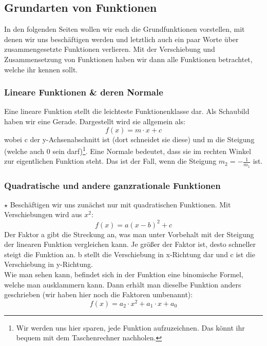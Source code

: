 \subsection{Grundarten von Funktionen}
	In den folgenden Seiten wollen wir euch die Grundfunktionen vorstellen, mit
	denen wir uns beschäftigen werden und letztlich auch ein paar Worte über
	zusammengesetzte Funktionen verlieren. Mit der Verschiebung und Zusammensetzung
	von Funktionen haben wir dann alle Funktionen betrachtet, welche ihr kennen
	sollt.

	\subsubsection{Lineare Funktionen \& deren Normale}
		Eine lineare Funktion stellt die leichteste Funktionenklasse dar. Als
		Schaubild haben wir eine Gerade. Dargestellt wird sie allgemein als:
		\[f(x)=m\cdot x+c\]
		wobei c der y-Achsenabschnitt ist (dort schneidet sie diese) und m die
		Steigung (welche auch 0 sein darf)\footnote{Wir werden uns hier sparen, jede
		Funktion aufzuzeichnen. Das könnt ihr bequem mit dem Taschenrechner
		nachholen.}. Eine Normale bedeutet, dass sie im rechten Winkel zur
		eigentlichen Funktion steht. Das ist der Fall, wenn die Steigung
		\(m_2=-\frac{1}{m_1}\) ist.

	\subsubsection{Quadratische und andere ganzrationale Funktionen}
		\(\star\) Beschäftigen wir uns zunächst nur mit quadratischen Funktionen. Mit
		Verschiebungen wird aus \(x^2\):
		\[f(x)=a(x-b)^2+c\]
		Der Faktor a gibt die Streckung an, was man unter Vorbehalt mit der Steigung
		der linearen Funktion vergleichen kann. Je größer der Faktor ist, desto
		schneller steigt die Funktion an. b  stellt die Verschiebung in x-Richtung dar
		und c ist die Verschiebung in y-Richtung.\\
		Wie man sehen kann, befindet sich in der Funktion eine binomische Formel,
		welche man ausklammern kann. Dann erhält man dieselbe Funktion anders
		geschrieben (wir haben hier noch die Faktoren umbenannt):
		\[f(x)=a_2 \cdot x^2+a_1 \cdot x+a_0\]

